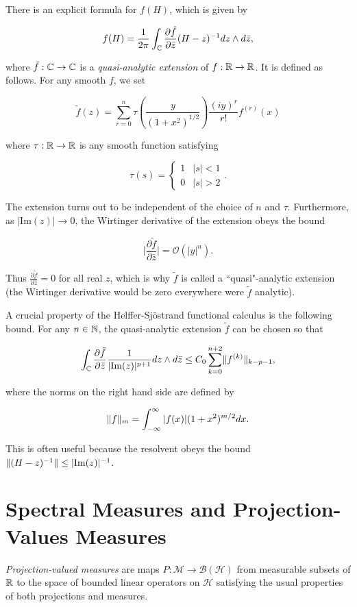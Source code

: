 \documentclass[12pt, letterpaper]{article}
\begin{document}
There is an explicit formula for $f(H)$, which is given by

\[ f(H) = \frac{1}{2\pi}\int_{\mathbb{C}} \frac{\partial \tilde{f}}{\partial \bar{z}} (H-z)^{-1}dz\wedge d\bar{z},\]

where $\tilde{f}:\mathbb{C}\to\mathbb{C}$ is a \emph{quasi-analytic extension} of $f:\mathbb{R}\to\mathbb{R}$. It is defined as follows. For any smooth $f$, we set

\[\tilde{f}(z) = \sum_{r=0}^n \tau\left(\frac{y}{(1+x^2)^{1/2}}\right)  \frac{(iy)^r}{r!} f^{(r)}(x)\]

where $\tau:\mathbb{R}\to\mathbb{R}$ is any smooth function satisfying 

\[\tau(s) = \begin{cases}1 & |s|<1 \\ 0 & |s|>2\end{cases}.\]

The extension turns out to be independent of the choice of $n$ and $\tau$. Furthermore, as $|\text{Im}(z)| \to 0$, the Wirtinger derivative of the extension obeys the bound 

\[\bigg|\frac{\partial \tilde{f}}{\partial \bar{z}} \bigg| = \mathcal{O}(|y|^n).\]

Thus $\frac{\partial \tilde{f}}{\partial \bar{z}} = 0$ for all real $z$, which is why $\tilde{f}$ is called a ``quasi"-analytic extension (the Wirtinger derivative would be zero everywhere were $\tilde{f}$ analytic).

A crucial property of the Helffer-Sj\"{o}strand functional calculus is the following bound. For any $n\in \mathbb{N}$, the quasi-analytic extension $\tilde{f}$ can be chosen so that 

\[\int_{\mathbb{C}}\frac{\partial \tilde{f}}{\partial \bar{z}} \frac{1}{|\text{Im}(z)|^{p+1}}dz\wedge d\bar{z} \leq C_0 \sum_{k=0}^{n+2 }\lVert f^{(k)} \rVert_{k-p-1},\]

where the norms on the right hand side are defined by 

\[\lVert f \rVert_{m} = \int_{-\infty}^\infty |f(x)|(1+x^2)^{m/2}dx.\]

This is often useful because the resolvent obeys the bound $\lVert (H-z)^{-1} \rVert \leq |\text{Im}(z)|^{-1}$.

\section{Spectral Measures and Projection-Values Measures}

\emph{Projection-valued measures} are maps $P:\mathcal{M}\to\mathcal{B}(\mathcal{H})$ from measurable subsets of $\mathbb{R}$ to the space of bounded linear operators on $\mathcal{H}$ satisfying the usual properties of both projections and measures.
\end{document}
